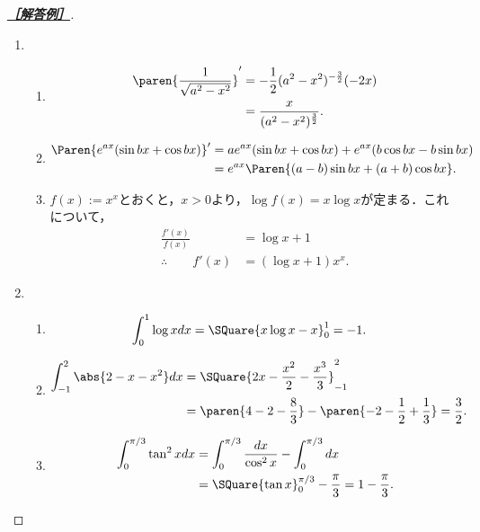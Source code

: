 \documentclass[uplatex,dvipdfmx]{jsarticle}
\begin{document}
\begin{proof}[\textbf{\underline{［解答例］}}]\mbox{}
    \begin{enumerate}
        \item \begin{enumerate}
            \item \begin{align*}
                \paren{\frac{1}{\sqrt{a^2-x^2}}}'&=-\frac{1}{2}(a^2-x^2)^{-\frac{3}{2}}(-2x)\\
                &=\frac{x}{(a^2-x^2)^{\frac{3}{2}}}.
            \end{align*}
            \item \begin{align*}
                \Paren{e^{ax}(\sin bx+\cos bx)}'&=ae^{ax}(\sin bx+\cos bx)+e^{ax}(b\cos bx-b\sin bx)\\
                &=e^{ax}\Paren{(a-b)\sin bx+(a+b)\cos bx}.
            \end{align*}
            \item $f(x):=x^x$とおくと，$x>0$より，$\log f(x)=x\log x$が定まる．これについて，
            \begin{align*}
                \frac{f'(x)}{f(x)}&=\log x+1\\
                \therefore\qquad f'(x)&=(\log x+1)x^x.
            \end{align*}
        \end{enumerate}
        \item \begin{enumerate}
            \item \begin{align*}
                \int^1_0\log xdx&=\SQuare{x\log x-x}^1_0=-1.
            \end{align*}
            \item \begin{align*}
                \int^2_{-1}\abs{2-x-x^2}dx&=\SQuare{2x-\frac{x^2}{2}-\frac{x^3}{3}}^2_{-1}\\
                &=\paren{4-2-\frac{8}{3}}-\paren{-2-\frac{1}{2}+\frac{1}{3}}=\frac{3}{2}.
            \end{align*}
            \item \begin{align*}
                \int^{\pi/3}_0\tan^2xdx&=\int^{\pi/3}_0\frac{dx}{\cos^2x}-\int^{\pi/3}_0dx\\
                &=\SQuare{\tan x}^{\pi/3}_0-\frac{\pi}{3}=1-\frac{\pi}{3}.
            \end{align*}

\end{enumerate}
\end{enumerate}
\end{proof}
\end{document}
